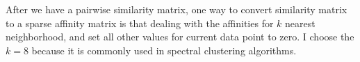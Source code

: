 After we have a pairwise similarity matrix, one way to convert similarity matrix to a sparse affinity matrix is that dealing with the affinities for $k$ nearest neighborhood, and set all other values for current data point to zero. 
I choose the $k = 8$ because it is commonly used in spectral clustering algorithms. 

